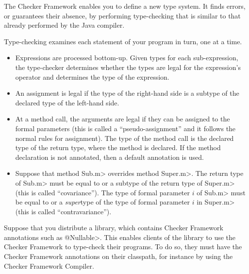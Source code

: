 
The Checker Framework enables you to define a new type system.  It finds
errors, or guarantees their absence, by performing type-checking that is
similar to that already performed by the Java compiler.

Type-checking examines each statement of your program in turn, one at a time.
\begin{itemize}
\item
Expressions are processed bottom-up.  Given types for each sub-expression,
the type-checker determines whether the types are legal for the
expression's operator and determines the type of the expression.

\item
An assignment is legal if the type of the right-hand side is a subtype of
the declared type of the left-hand side.

\item
 At a method call, the arguments are legal if they can be assigned to the
 formal parameters (this is called a ``pseudo-assignment'' and it follows
 the normal rules for assignment).  The type of the method call is the
 declared type of the return type, where the method is declared.  If
 the method declaration is not annotated, then a default annotation is
 used.

\item
  Suppose that method \<Sub.m> overrides method \<Super.m>.
  The return type of \<Sub.m> must be equal to or a subtype of the return
  type of \<Super.m> (this is called ``covariance'').
  The type of formal parameter $i$ of \<Sub.m> must be equal to or a
  \emph{super}type of the type of formal parameter $i$ in \<Super.m> (this
  is called ``contravariance'').

\end{itemize}



Suppose that you distribute a library, which contains Checker Framework
annotations such as \<@Nullable>.  This enables clients of the library to
use the Checker Framework to type-check their programs.  To do so, they
must have the Checker Framework annotations on their classpath, for
instance by using the Checker Framework Compiler.

